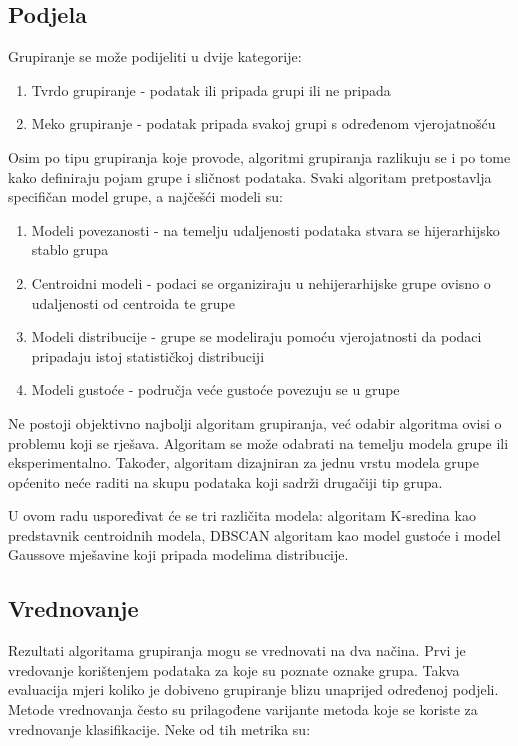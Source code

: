 \documentclass[utf8, diplomski, numeric]{fer}
\begin{document}
\subsection{Podjela}
Grupiranje se može podijeliti u dvije kategorije:

\begin{enumerate}
\item Tvrdo grupiranje - podatak ili pripada grupi ili ne pripada
\item Meko grupiranje - podatak pripada svakoj grupi s određenom vjerojatnošću
\end{enumerate}

Osim po tipu grupiranja koje provode, algoritmi grupiranja razlikuju se i po tome kako definiraju pojam grupe i sličnost podataka. Svaki algoritam pretpostavlja specifičan model grupe, a najčešći modeli su:

\begin{enumerate}
\item Modeli povezanosti - na temelju udaljenosti podataka stvara se hijerarhijsko stablo grupa 
\item Centroidni modeli - podaci se organiziraju u nehijerarhijske grupe ovisno o udaljenosti od centroida te grupe
\item Modeli distribucije - grupe se modeliraju pomoću vjerojatnosti da podaci pripadaju istoj statističkoj distribuciji
\item Modeli gustoće - područja veće gustoće povezuju se u grupe
\end{enumerate}

Ne postoji objektivno najbolji algoritam grupiranja, već odabir algoritma ovisi o problemu koji se rješava. Algoritam se može odabrati na temelju modela grupe ili eksperimentalno. Također, algoritam dizajniran za jednu vrstu modela grupe općenito neće raditi na skupu podataka koji sadrži drugačiji tip grupa.

U ovom radu uspoređivat će se tri različita modela: algoritam K-sredina kao predstavnik centroidnih modela, DBSCAN algoritam kao model gustoće i model Gaussove mješavine koji pripada modelima distribucije.

\subsection{Vrednovanje}
Rezultati algoritama grupiranja mogu se vrednovati na dva načina. Prvi je vredovanje korištenjem podataka za koje su poznate oznake grupa. Takva evaluacija mjeri koliko je dobiveno grupiranje blizu unaprijed određenoj podjeli. Metode vrednovanja često su prilagođene varijante metoda koje se koriste za vrednovanje klasifikacije. Neke od tih metrika su:
\end{document}
